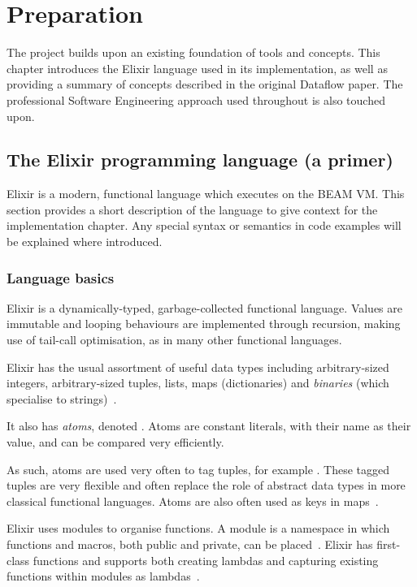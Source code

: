 \chapter{Preparation}\label{ch:prep}

The project builds upon an existing foundation of tools and concepts.
This chapter introduces the Elixir language used in its implementation, as well as providing a summary of concepts described in the original Dataflow paper.
The professional Software Engineering approach used throughout is also touched upon.

\section{The Elixir programming language (a primer)}\label{sec:prep:elixir}

Elixir is a modern, functional language which executes on the BEAM VM.
This section provides a short description of the language to give context for the implementation chapter.
Any special syntax or semantics in code examples will be explained where introduced.

\subsection{Language basics}\label{sec:prep:elixir:basics}

Elixir is a dynamically-typed, garbage-collected functional language.
Values are immutable and looping behaviours are implemented through recursion, making use of tail-call optimisation, as in many other functional languages.

Elixir has the usual assortment of useful data types including arbitrary-sized integers, arbitrary-sized tuples, lists, maps (dictionaries) and \emph{binaries} (which specialise to strings)~\cite[p.~23]{Thomas:2016}.

It also has \emph{atoms}, denoted .
Atoms are constant literals, with their name as their value, and can be compared very efficiently.

As such, atoms are used very often to tag tuples, for example .
These tagged tuples are very flexible and often replace the role of abstract data types in more classical functional languages.
Atoms are also often used as keys in maps~\cite[p.~29]{Thomas:2016}.

Elixir uses modules to organise functions.
A module is a namespace in which functions and macros, both public and private, can be placed~\cite[p.~58]{Thomas:2016}.
Elixir has first-class functions and supports both creating lambdas and capturing existing functions within modules as lambdas~\cite[p.~37]{Thomas:2016}.

